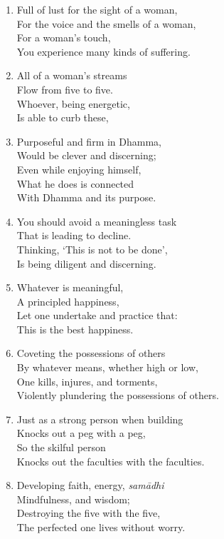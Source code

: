 \documentclass[10pt, openany]{book}
\begin{document}
\begin{enumerate}
\item Full of lust for the sight of a woman,\\
For the voice and the smells of a woman,\\
For a woman’s touch,\\
You experience many kinds of suffering.

\item All of a woman’s streams\\
Flow from five to five.\\
Whoever, being energetic,\\
Is able to curb these,

\item Purposeful and firm in Dhamma,\\
Would be clever and discerning;\\
Even while enjoying himself,\\
What he does is connected \\
With Dhamma and its purpose.

\item You should avoid a meaningless task\\
That is leading to decline.\\
Thinking, ‘This is not to be done’,\\
Is being diligent and discerning.

\item Whatever is meaningful,\\
A principled happiness,\\
Let one undertake and practice that:\\
This is the best happiness.

\item Coveting the possessions of others\\
By whatever means, whether high or low,\\
One kills, injures, and torments,\\
Violently plundering the possessions of others.

\item Just as a strong person when building\\
Knocks out a peg with a peg,\\
So the skilful person\\
Knocks out the faculties with the faculties.

\item Developing faith, energy, \emph{samādhi}\\
Mindfulness, and wisdom;\\
Destroying the five with the five,\\
The perfected one lives without worry.


\end{enumerate}
\end{document}
